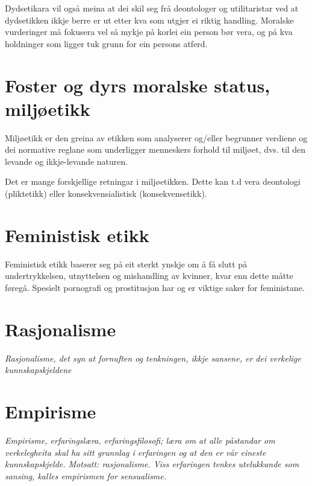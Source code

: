 \documentclass[a4paper]{IEEEtran}
\begin{document}
Dydsetikara vil også meina at dei skil seg frå deontologer og utilitaristar ved at dydsetikken ikkje berre er ut etter kva som utgjer ei riktig handling. Moralske vurderinger må fokusera vel så mykje på korlei ein person bør vera, og på kva holdninger som ligger tuk grunn for ein persons atferd. \bigskip

\section{Foster og dyrs moralske status, miljøetikk}
\label{fdms}\bigskip

Miljøetikk er den greina av etikken som analyserer og/eller begrunner verdiene og dei normative reglane som underligger menneskers forhold til miljøet, dvs. til den levande og ikkje-levande naturen.\bigskip

Det er mange forskjellige retningar i miljøetikken. Dette kan t.d vera deontologi (pliktetikk) eller konsekvensialistisk (konsekvensetikk). 

\section{Feministisk etikk}
\label{femimisme}\bigskip

Feministisk etikk baserer seg på eit sterkt ynskje om å få slutt på undertrykkelsen, utnyttelsen og mishandling av kvinner, kvar enn dette måtte føregå. Spesielt pornografi og prostitusjon har og er viktige saker for feministane. 

\section{Rasjonalisme}
\label{rasjonalisme}\bigskip

\textit{Rasjonalisme, det syn at fornuften og tenkningen, ikkje sansene, er dei verkelige kunnskapskjeldene}

\section{Empirisme}
\label{empirisme}\bigskip

\textit{Empirisme, erfaringslæra, erfaringsfilosofi; læra om at alle påstandar om verkelegheita skal ha sitt grunnlag i erfaringen og at den er vår eineste kunnskapskjelde. Motsatt: rasjonalisme. Viss erfaringen tenkes utelukkande som sansing, kalles empirismen for sensualisme.}


\end{document}

